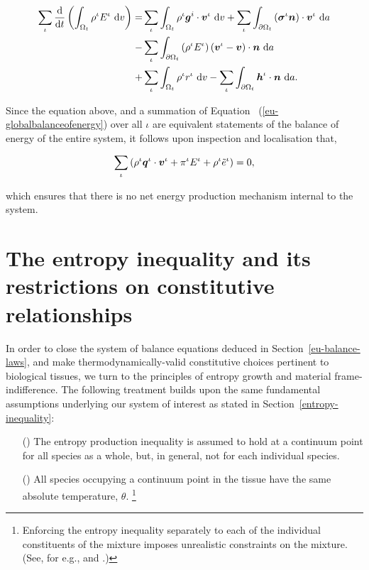\begin{equation}
\begin{split}
\sum\limits_{\iota}
\frac{\mathrm{d}}{\mathrm{d}t}\left(\int_{\Omega_{t}} \rho^{\iota}
E^{\iota}\ \mathrm{d}v \right) = & \sum\limits_{\iota}
\int_{\Omega_{t}} \rho^{\iota} \mbox{\boldmath$ g$}^i\cdot\mbox{\boldmath$ v$}^{\iota}\ \mathrm{d}v +
\sum\limits_{\iota} \int_{\partial \Omega_{t}}
\left(\mbox{\boldmath$\sigma$}^{\iota}\mbox{\boldmath$ n$}\right)\cdot\mbox{\boldmath$ v$}^{\iota}\ \mathrm{d}a\\ -&
\sum\limits_{\iota} \int_{\partial \Omega_{t}} \left(\rho^{\iota}
E^{\iota} \right) \left(\mbox{\boldmath$ v$}^{\iota} - \mbox{\boldmath$ v$}\right) \cdot
\mbox{\boldmath$ n$}\ \mathrm{d}a \\ + & \sum\limits_{\iota} \int_{\Omega_{t}}
\rho^{\iota} r^{\iota}\ \mathrm{d}v - \sum\limits_{\iota}
\int_{\partial \Omega_{t}} \mbox{\boldmath$ h$}^{\iota}\cdot\mbox{\boldmath$ n$}\ \mathrm{d}a.
\end{split}
\label{eu-energyexternal}
\end{equation}
 
\noindent Since the equation above, and a summation of Equation~%
(\ref{eu-globalbalanceofenergy}) over all $\iota$ are equivalent
statements of the balance of energy of the entire system, it follows
upon inspection and localisation that,

\begin{equation}
 \sum\limits_{\iota} \left( \rho^{\iota}\mbox{\boldmath$ q$}^{\iota}\cdot\mbox{\boldmath$ v$}^{\iota} +
 \pi^{\iota} E^{\iota} + \rho^{\iota}\tilde{e}^{\iota} \right) = 0,
\label{eu-summationrelationenergy}
\end{equation}

\noindent which ensures that there is no net energy production
mechanism internal to the system.

\section{The entropy inequality and its restrictions on constitutive
  relationships}
\label{eu-entropy-inequality}

In order to close the system of balance equations deduced in
Section~\ref{eu-balance-laws}, and make thermodynamically-valid
constitutive choices pertinent to biological tissues, we turn to the
principles of entropy growth and material frame-indifference. The
following treatment builds upon the same fundamental assumptions
underlying our system of interest as stated in
Section~\ref{entropy-inequality}:

\begin{enumerate}
\item[(\romannumeral 1)] The entropy production inequality is assumed
  to hold at a continuum point for all species as a whole, but, in
  general, not for each individual species.
\item[(\romannumeral 2)] All species occupying a continuum point in
  the tissue have the same absolute temperature, $\theta$.%
  \footnote{Enforcing the entropy inequality separately to each of the
    individual constituents of the mixture imposes unrealistic
    constraints on the mixture. (See, for e.g.,
    \citet{BedfordDrumheller:1983} and \citet{ateshian07}.)}
\end{enumerate} 

